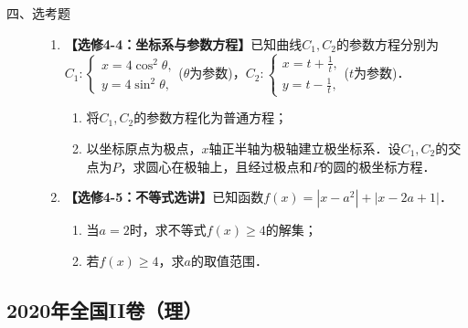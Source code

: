 \begin{description}
    \item[四、选考题]
    \begin{enumerate}[leftmargin=5pt]
        \addtocounter{enumi}{+21}
        \item \textbf{【选修4-4：坐标系与参数方程】}已知曲线$C_1,C_2$的参数方程分别为$C_1:\begin{cases}x=4\cos^2\theta,\\y=4\sin^2\theta,\end{cases}$($\theta$为参数)，$C_2:\begin{cases}x=t+\frac{1}{t},\\y=t-\frac{1}{t},\end{cases}$($t$为参数)．
        \begin{enumerate}[label=(\arabic*)]
            \item 将$C_1,C_2$的参数方程化为普通方程；
            \item 以坐标原点为极点，$x$轴正半轴为极轴建立极坐标系．设$C_1,C_2$的交点为$P$，求圆心在极轴上，且经过极点和$P$的圆的极坐标方程．
        \end{enumerate}

        \item \textbf{【选修4-5：不等式选讲】}已知函数$f(x)=|x-a^2|+|x-2a+1|$．
        \begin{enumerate}[label=(\arabic*)]
            \item 当$a=2$时，求不等式$f(x)\geqslant 4$的解集；
            \item 若$f(x)\geqslant 4$，求$a$的取值范围．
        \end{enumerate}
    \end{enumerate}
\end{description}
\clearpage


\subsection{2020年全国II卷（理）}\label{gk:2020年全国II卷（理）}

